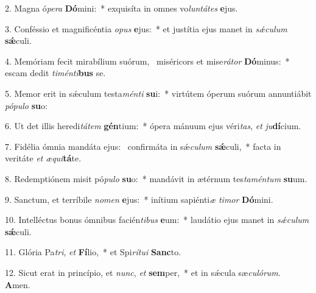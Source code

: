2. Magna ó\textit{pe}\textit{ra} \textbf{Dó}mini:~*  exquisíta in omnes vo\textit{lun}\textit{tá}\textit{tes} \textbf{e}jus.\

3. Conféssio et magnificéntia \textit{o}\textit{pus} \textbf{e}jus:~*  et justítia ejus manet in \textit{sǽ}\textit{cu}\textit{lum} \textbf{sǽ}culi.\

4. Memóriam fecit mirabílium suórum, \dag\  miséricors et mise\textit{rá}\textit{tor} \textbf{Dó}minus:~*  escam dedit \textit{ti}\textit{mén}\textit{ti}\textbf{bus} se.\

5. Memor erit in sǽculum testa\textit{mén}\textit{ti} \textbf{su}i:~*  virtútem óperum suórum annuntiábit \textit{pó}\textit{pu}\textit{lo} \textbf{su}o:\

6. Ut det illis heredi\textit{tá}\textit{tem} \textbf{gén}tium:~*  ópera mánuum ejus véri\textit{tas}, \textit{et} \textit{ju}\textbf{dí}cium.\

7. Fidélia ómnia mandáta ejus: \dag\  confirmáta in sǽ\textit{cu}\textit{lum} \textbf{sǽ}culi,~*  facta in veritáte \textit{et} \textit{æ}\textit{qui}\textbf{tá}te.\

8. Redemptiónem misit pó\textit{pu}\textit{lo} \textbf{su}o:~*  mandávit in ætérnum tes\textit{ta}\textit{mén}\textit{tum} \textbf{su}um.\

9. Sanctum, et terríbile \textit{no}\textit{men} \textbf{e}jus:~*  inítium sapiénti\textit{æ} \textit{ti}\textit{mor} \textbf{Dó}mini.\

10. Intelléctus bonus ómnibus facién\textit{ti}\textit{bus} \textbf{e}um:~*  laudátio ejus manet in \textit{sǽ}\textit{cu}\textit{lum} \textbf{sǽ}culi.\

11. Glória Pa\textit{tri}, \textit{et} \textbf{Fí}lio,~*  et Spi\textit{rí}\textit{tu}\textit{i} \textbf{Sanc}to.\

12. Sicut erat in princípio, et \textit{nunc}, \textit{et} \textbf{sem}per,~*  et in sǽcula sæ\textit{cu}\textit{ló}\textit{rum}. \textbf{A}men.\

